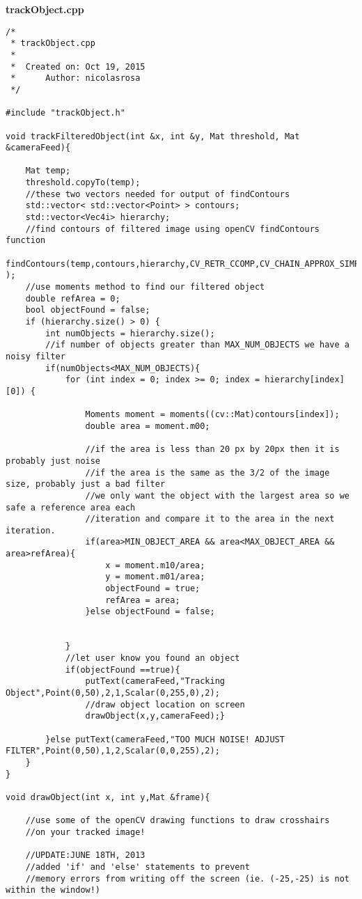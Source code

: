\textbf{trackObject.cpp}
\begin{lstlisting}[basicstyle=\tiny]
/*
 * trackObject.cpp
 *
 *  Created on: Oct 19, 2015
 *      Author: nicolasrosa
 */

#include "trackObject.h"

void trackFilteredObject(int &x, int &y, Mat threshold, Mat &cameraFeed){

	Mat temp;
	threshold.copyTo(temp);
	//these two vectors needed for output of findContours
	std::vector< std::vector<Point> > contours;
	std::vector<Vec4i> hierarchy;
	//find contours of filtered image using openCV findContours function
	findContours(temp,contours,hierarchy,CV_RETR_CCOMP,CV_CHAIN_APPROX_SIMPLE );
	//use moments method to find our filtered object
	double refArea = 0;
	bool objectFound = false;
	if (hierarchy.size() > 0) {
		int numObjects = hierarchy.size();
        //if number of objects greater than MAX_NUM_OBJECTS we have a noisy filter
        if(numObjects<MAX_NUM_OBJECTS){
			for (int index = 0; index >= 0; index = hierarchy[index][0]) {

				Moments moment = moments((cv::Mat)contours[index]);
				double area = moment.m00;

				//if the area is less than 20 px by 20px then it is probably just noise
				//if the area is the same as the 3/2 of the image size, probably just a bad filter
				//we only want the object with the largest area so we safe a reference area each
				//iteration and compare it to the area in the next iteration.
                if(area>MIN_OBJECT_AREA && area<MAX_OBJECT_AREA && area>refArea){
					x = moment.m10/area;
					y = moment.m01/area;
					objectFound = true;
					refArea = area;
				}else objectFound = false;


			}
			//let user know you found an object
			if(objectFound ==true){
				putText(cameraFeed,"Tracking Object",Point(0,50),2,1,Scalar(0,255,0),2);
				//draw object location on screen
				drawObject(x,y,cameraFeed);}

		}else putText(cameraFeed,"TOO MUCH NOISE! ADJUST FILTER",Point(0,50),1,2,Scalar(0,0,255),2);
	}
}

void drawObject(int x, int y,Mat &frame){

	//use some of the openCV drawing functions to draw crosshairs
	//on your tracked image!

    //UPDATE:JUNE 18TH, 2013
    //added 'if' and 'else' statements to prevent
    //memory errors from writing off the screen (ie. (-25,-25) is not within the window!)


\end{lstlisting}
